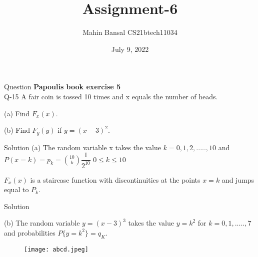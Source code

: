 \documentclass[15pt]{beamer}
\title{Assignment-6}
\author{Mahin Bansal  CS21btech11034}
\date{July 9, 2022}
\begin{document}
    \maketitle
    
    \begin{frame}{Question}
        \textbf{Papoulis book exercise 5}\\
        \large \noindent Q-15 A fair coin is tossed 10 times and x equals the number of heads.
        
        (a) Find $F_x(x)$.
        
        (b) Find $F_y(y)$ if $y = (x-3)^2$.
    \end{frame}
    \begin{frame}{Solution}
    (a) The random variable x takes the value $k = 0,1,2,.....,10$ and \\
     \hspace{5mm}$P(x=k) = p_k = {10\choose k}\dfrac{1}{2^{10}}$ \hspace{5mm} $0\leq k \leq 10$
    
    $F_x(x)$ is a staircase function with discontinuities at the points $x=k$ and jumps equal to $P_k$.
    \end{frame}
    \begin{frame}{Solution}
    
    (b) The random variable $y = (x - 3)^3$
    takes the value $y = k^2$ for $k = 0,1,.....,7$ and probabilities $P\{y = k^2\} = q_K$.

       \begin{figure}[!ht]
		\centering
		\texttt{[image: abcd.jpeg]}
	
		\label{fig1}
	\end{figure}
    \end{frame}   
\end{document}
